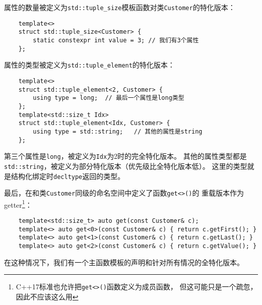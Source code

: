属性的数量被定义为\texttt{std::tuple\_size}模板函数对类\texttt{Customer}的特化版本：
\begin{lstlisting}
    template<>
    struct std::tuple_size<Customer> {
        static constexpr int value = 3; // 我们有3个属性
    };
\end{lstlisting}
属性的类型被定义为\texttt{std::tuple\_element}的特化版本：
\begin{lstlisting}
    template<>
    struct std::tuple_element<2, Customer> {
        using type = long;  // 最后一个属性是long类型
    };
    template<std::size_t Idx>
    struct std::tuple_element<Idx, Customer> {
        using type = std::string;   // 其他的属性是string
    };
\end{lstlisting}
第三个属性是\texttt{long}，被定义为\texttt{Idx}为2时的完全特化版本。
其他的属性类型都是\texttt{std::string}，被定义为部分特化版本（优先级比全特化版本低）。
这里的类型就是结构化绑定时\texttt{decltype}返回的类型。

最后，在和类\texttt{Customer}同级的命名空间中定义了函数\texttt{get<>()}的
重载版本作为getter\footnote{C++17标准也允许把\texttt{get<>()}函数定义为成员函数，
但这可能只是一个疏忽，因此不应该这么用}：
\begin{lstlisting}
    template<std::size_t> auto get(const Customer& c);
    template<> auto get<0>(const Customer& c) { return c.getFirst(); }
    template<> auto get<1>(const Customer& c) { return c.getLast(); }
    template<> auto get<2>(const Customer& c) { return c.getValue(); }
\end{lstlisting}
在这种情况下，我们有一个主函数模板的声明和针对所有情况的全特化版本。


